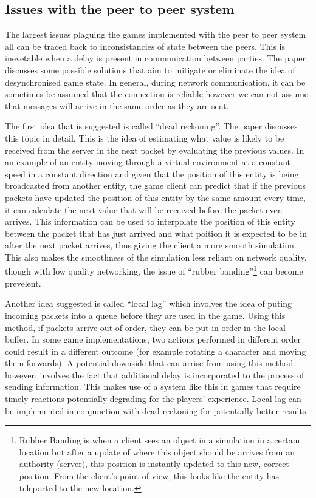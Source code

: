 \subsection{Issues with the peer to peer system}
The largest issues plaguing the games implemented with the peer to peer system all can be traced back to inconsistancies of state between the peers. This is inevetable when a delay is present in communication between parties. The paper  discusses some possible solutions that aim to mitigate or eliminate the idea of desynchronised game state. In general, during network communication, it can be sometimes be assumed that the connection is reliable however we can not assume that messages will arrive in the same order as they are sent.

The first idea that is suggested is called ``dead reckoning''. The paper  discusses this topic in detail. This is the idea of estimating what value is likely to be received from the server in the next packet by evaluating the previous values. In an example of an entity moving through a virtual environment at a constant speed in a constant direction and given that the position of this entity is being broadcasted from another entity, the game client can predict that if the previous packets have updated the position of this entity by the same amount every time, it can calculate the next value that will be received before the packet even arrives. This information can be used to interpolate the position of this entity between the packet that has just arrived and what poition it is expected to be in after the next packet arrives, thus giving the client a more smooth simulation. This also makes the smoothness of the simulation less reliant on network quality, though with low quality networking, the issue of ``rubber banding''\footnote{Rubber Banding is when a client sees an object in a simulation in a certain location but after a update of where this object should be arrives from an authority (server), this position is instantly updated to this new, correct position. From the client's point of view, this looks like the entity has teleported to the new location.} can become prevelent.

Another idea suggested is called ``local lag'' which involves the idea of puting incoming packets into a queue before they are used in the game. Using this method, if packets arrive out of order, they can be put in-order in the local buffer. In some game implementations, two actions performed in different order could result in a different outcome (for example rotating a character and moving them forwards). A potential downside that can arrise from using this method however, involves the fact that additional delay is incorporated to the process of sending information. This makes use of a system like this in games that require timely reactions potentially degrading for the players' experience. Local lag can be implemented in conjunction with dead reckoning for potentially better results.

